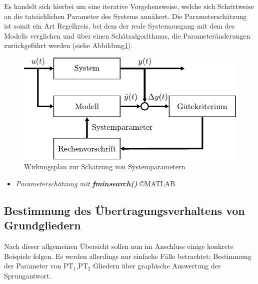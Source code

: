 %
Es handelt sich hierbei um eine iterative Vorgehensweise, welche sich Schrittweise an die tatsächlichen Parameter des Systems annähert. Die Parameterschätzung ist somit ein Art Regelkreis, bei dem der reale Systemausgang mit dem des Modells verglichen und über einen Schätzalgorithmus, die Parameteränderungen zurückgeführt werden (siehe Abbildung\ref{fig:parameterschaetzen}).
%
\begin{figure}[h]
	\centering
	\includegraphics[width=0.7\linewidth]{Abbildungen/Modellbildung/PDF/ParameterSchaetzung.pdf}
	\caption{Wirkungsplan zur Schätzung von Systemparametern \cite{Foellinger94}}
	\label{fig:parameterschaetzen}
\end{figure}
%
\begin{simulation}{}{}
	\begin{itemize}
		\item \textit{Parameterschätzung mit \textbf{fminsearch()}} \copyright MATLAB
	\end{itemize}
\end{simulation}
%
\subsection{Bestimmung des Übertragungsverhaltens von Grundgliedern}
%
Nach dieser allgemeinen Übersicht sollen nun im Anschluss einige konkrete Beispiele folgen. Es werden allerdings nur einfache Fälle betrachtet; Bestimmung der Parameter von $\text{PT}_{1}$,$\text{PT}_{2}$ Gliedern über graphische Auswertung der Sprungantwort.
%
